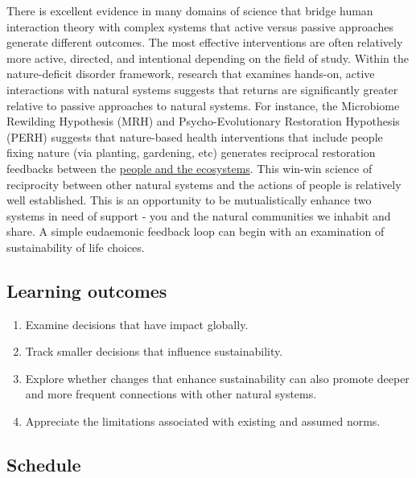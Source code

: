\documentclass[
]{book}
\providecommand{\tightlist}{%
  \setlength{\itemsep}{0pt}\setlength{\parskip}{0pt}}
\begin{document}
There is excellent evidence in many domains of science that bridge human interaction theory with complex systems that active versus passive approaches generate different outcomes. The most effective interventions are often relatively more active, directed, and intentional depending on the field of study. Within the nature-deficit disorder framework, research that examines hands-on, active interactions with natural systems suggests that returns are significantly greater relative to passive approaches to natural systems. For instance, the Microbiome Rewilding Hypothesis (MRH) and Psycho-Evolutionary Restoration Hypothesis (PERH) suggests that nature-based health interventions that include people fixing nature (via planting, gardening, etc) generates reciprocal restoration feedbacks between the \href{https://www.liebertpub.com/doi/full/10.1089/eco.2020.0003}{people and the ecosystems}. This win-win science of reciprocity between other natural systems and the actions of people is relatively well established. This is an opportunity to be mutualistically enhance two systems in need of support - you and the natural communities we inhabit and share. A simple eudaemonic feedback loop can begin with an examination of sustainability of life choices.

\hypertarget{learning-outcomes}{%
\subsection*{Learning outcomes}\label{learning-outcomes}}

\begin{enumerate}
\def\labelenumi{\arabic{enumi}.}
\tightlist
\item
  Examine decisions that have impact globally.\\
\item
  Track smaller decisions that influence sustainability.\\
\item
  Explore whether changes that enhance sustainability can also promote deeper and more frequent connections with other natural systems.\\
\item
  Appreciate the limitations associated with existing and assumed norms.
\end{enumerate}

\hypertarget{schedule}{%
\subsection*{Schedule}\label{schedule}}
\end{document}
